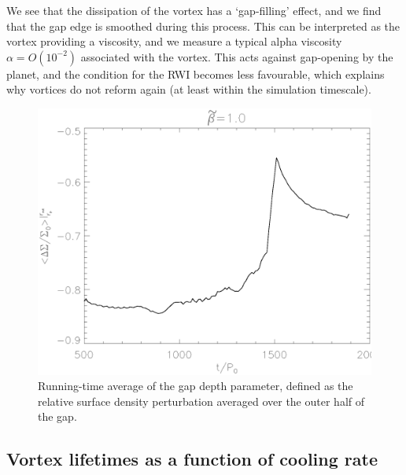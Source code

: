 We see that the dissipation of the vortex has a `gap-filling'
effect, and we find that the gap edge is smoothed during this
process. This can be interpreted as the vortex providing a
viscosity, and we measure a typical alpha viscosity $\alpha = O(10^{-2})$
associated with the vortex. This acts against gap-opening
by the planet, and   
the condition for the RWI
becomes less favourable, which explains why vortices do not
reform again (at least within the simulation timescale).  


\begin{figure}
  \includegraphics[width=\linewidth]{figures/gapdepth}
  \caption{Running-time average of the gap depth parameter, defined as
    the relative surface density perturbation averaged over the
    outer half of the gap.} \label{gapdepth}
\end{figure}


\subsection{Vortex lifetimes as a function of cooling rate}


